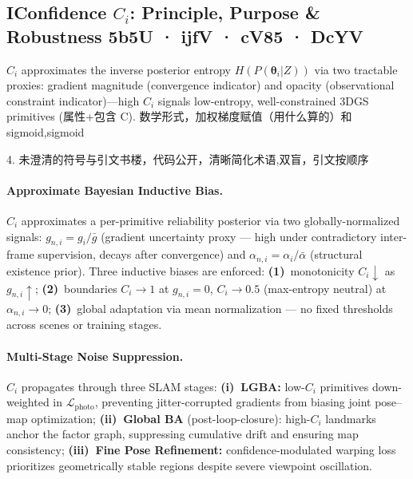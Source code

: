 \documentclass[conference]{IEEEtran}
\begin{document}
\clearpage
\subsection*{I\enspace Confidence $C_i$: Principle, Purpose \& Robustness%
  \hfill{\footnotesize\color{gray}5b5U · ijfV · cV85 · DcYV}}

$C_i$ approximates the inverse posterior entropy $H(P(\boldsymbol{\theta}_i | Z))$ via two tractable proxies: gradient magnitude (convergence indicator) and opacity (observational constraint indicator)—high $C_i$ signals low-entropy, well-constrained 3DGS primitives (属性+包含 C). 数学形式，加权梯度赋值（用什么算的）和 sigmoid,sigmoid 

4.
未澄清的符号与引文书楼，代码公开，清晰简化术语,双盲，引文按顺序
\paragraph{Approximate Bayesian Inductive Bias.}
$C_i$ approximates a per-primitive reliability posterior via two globally-normalized
signals: $g_{n,i}=g_i/\bar{g}$ (gradient uncertainty proxy — high under
contradictory inter-frame supervision, decays after convergence)
and $\alpha_{n,i}=\alpha_i/\bar{\alpha}$ (structural existence prior).
Three inductive biases are enforced:
\textbf{(1)}~monotonicity $C_i\!\downarrow$ as $g_{n,i}\!\uparrow$;
\textbf{(2)}~boundaries $C_i\!\to\!1$ at $g_{n,i}\!=\!0$,
$C_i\!\to\!0.5$ (max-entropy neutral) at $\alpha_{n,i}\!\to\!0$;
\textbf{(3)}~global adaptation via mean normalization — no fixed thresholds
across scenes or training stages.

\paragraph{Multi-Stage Noise Suppression.}
$C_i$ propagates through three SLAM stages:
\textbf{(i)~LGBA:} low-$C_i$ primitives down-weighted in $\mathcal{L}_\text{photo}$,
preventing jitter-corrupted gradients from biasing joint pose--map optimization;
\textbf{(ii)~Global BA} (post-loop-closure): high-$C_i$ landmarks anchor the factor
graph, suppressing cumulative drift and ensuring map consistency;
\textbf{(iii)~Fine Pose Refinement:} confidence-modulated warping loss prioritizes
geometrically stable regions despite severe viewpoint oscillation.
\end{document}
